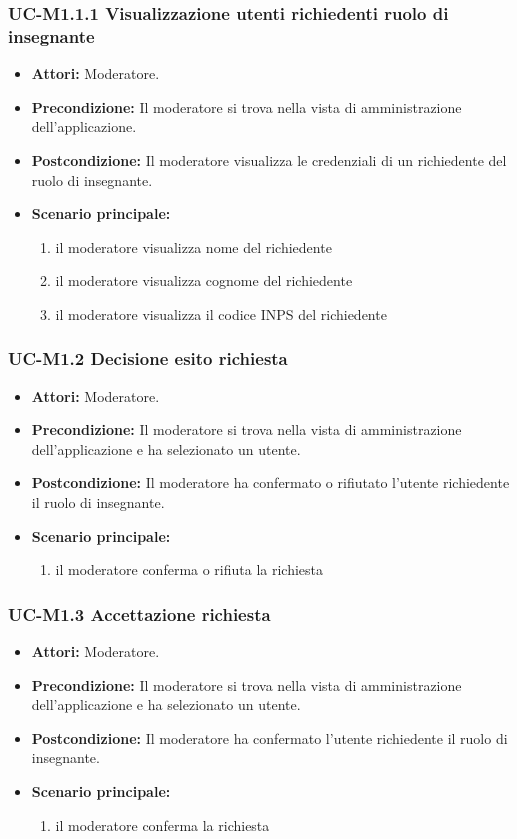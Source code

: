 \subsubsection{UC-M1.1.1 Visualizzazione utenti richiedenti ruolo di insegnante}
	\begin{itemize}
		\item \textbf{Attori:} Moderatore.
		\item \textbf{Precondizione:} Il moderatore si trova nella vista di amministrazione dell'applicazione.
		\item \textbf{Postcondizione:} Il moderatore visualizza le credenziali di un richiedente del ruolo di insegnante.
		\item \textbf{Scenario principale:}
			\begin{enumerate}
				\item il moderatore visualizza nome del richiedente
				\item il moderatore visualizza cognome del richiedente
				\item il moderatore visualizza il codice INPS del richiedente
			\end{enumerate}
	\end{itemize}			

\subsubsection{UC-M1.2 Decisione esito richiesta}
	\begin{itemize}
		\item \textbf{Attori:} Moderatore.
		\item \textbf{Precondizione:} Il moderatore si trova nella vista di amministrazione dell'applicazione e ha selezionato un utente.
		\item \textbf{Postcondizione:} Il moderatore ha confermato o rifiutato l'utente richiedente il ruolo di insegnante.
		\item \textbf{Scenario principale:}
			\begin{enumerate}
				\item il moderatore conferma o rifiuta la richiesta
			\end{enumerate}
	\end{itemize}

\subsubsection{UC-M1.3 Accettazione richiesta}
	\begin{itemize}
		\item \textbf{Attori:} Moderatore.
		\item \textbf{Precondizione:} Il moderatore si trova nella vista di amministrazione dell'applicazione e ha selezionato un utente.
		\item \textbf{Postcondizione:} Il moderatore ha confermato l'utente richiedente il ruolo di insegnante.
		\item \textbf{Scenario principale:}
			\begin{enumerate}
				\item il moderatore conferma la richiesta
			\end{enumerate}
	\end{itemize}

